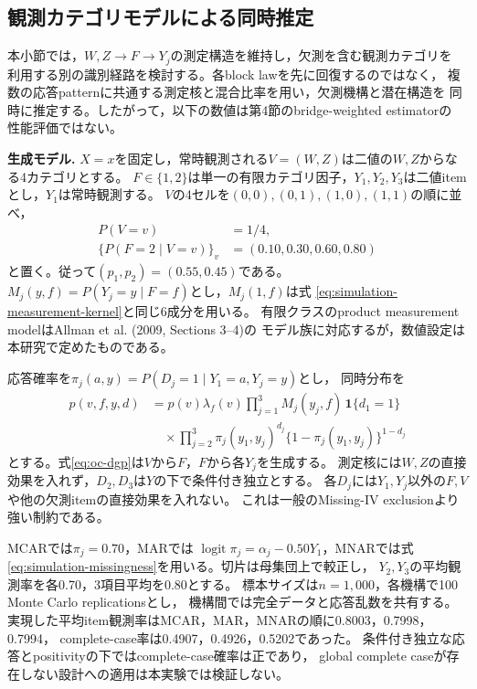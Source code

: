 \subsection{観測カテゴリモデルによる同時推定}
\label{sec:observed-category-simulation}
本小節では，$W,Z\to F\to Y_j$の測定構造を維持し，欠測を含む観測カテゴリを
利用する別の識別経路を検討する。各block lawを先に回復するのではなく，
複数の応答patternに共通する測定核と混合比率を用い，欠測機構と潜在構造を
同時に推定する。したがって，以下の数値は第4節のbridge-weighted estimatorの
性能評価ではない。

\noindent\textbf{生成モデル.}
$X=x$を固定し，常時観測される$V=(W,Z)$は二値の$W,Z$からなる4カテゴリとする。
$F\in\{1,2\}$は単一の有限カテゴリ因子，$Y_1,Y_2,Y_3$は二値itemとし，$Y_1$は常時観測する。
$V$の4セルを$(0,0),(0,1),(1,0),(1,1)$の順に並べ，
\begin{equation}
\begin{aligned}
P(V=v)&=1/4,\\
\{P(F=2\mid V=v)\}_v&=(0.10,0.30,0.60,0.80)
\end{aligned}
\label{eq:oc-v-lambda}
\end{equation}
と置く。従って$(p_1,p_2)=(0.55,0.45)$である。
$M_j(y,f)=P(Y_j=y\mid F=f)$とし，$M_j(1,f)$は式
\eqref{eq:simulation-measurement-kernel}と同じ6成分を用いる。
有限クラスのproduct measurement modelはAllman et al. (2009, Sections 3--4)の
モデル族に対応するが，数値設定は本研究で定めたものである。

応答確率を$\pi_j(a,y)=P(D_j=1\mid Y_1=a,Y_j=y)$とし，
同時分布を
\begin{equation}
\begin{aligned}
p(v,f,y,d)
&=p(v)\lambda_f(v)\prod_{j=1}^{3}M_j(y_j,f)\,
\mathbf1\{d_1=1\}\\
&\quad\times\prod_{j=2}^{3}\pi_j(y_1,y_j)^{d_j}
\{1-\pi_j(y_1,y_j)\}^{1-d_j}
\end{aligned}
\label{eq:oc-dgp}
\end{equation}
とする。式\eqref{eq:oc-dgp}は$V$から$F$，$F$から各$Y_j$を生成する。
測定核には$W,Z$の直接効果を入れず，$D_2,D_3$は$Y$の下で条件付き独立とする。
各$D_j$には$Y_1,Y_j$以外の$F,V$や他の欠測itemの直接効果を入れない。
これは一般のMissing-IV exclusionより強い制約である。

MCARでは$\pi_j=0.70$，MARでは
$\operatorname{logit}\pi_j=\alpha_j-0.50Y_1$，MNARでは式
\eqref{eq:simulation-missingness}を用いる。切片は母集団上で較正し，
$Y_2,Y_3$の平均観測率を各0.70，3項目平均を0.80とする。
標本サイズは$n=1{,}000$，各機構で100 Monte Carlo replicationsとし，
機構間では完全データと応答乱数を共有する。
実現した平均item観測率はMCAR，MAR，MNARの順に0.8003，0.7998，0.7994，
complete-case率は0.4907，0.4926，0.5202であった。
条件付き独立な応答とpositivityの下ではcomplete-case確率は正であり，
global complete caseが存在しない設計への適用は本実験では検証しない。

